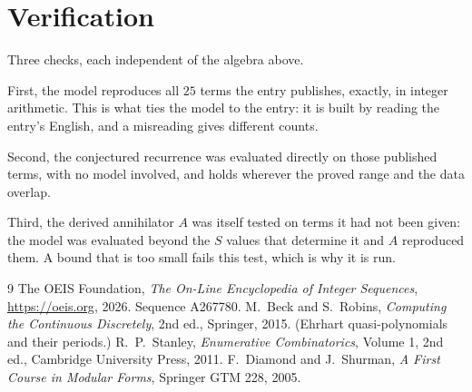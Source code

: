 \documentclass[11pt,a4paper]{article}
\theoremstyle{plain}
\theoremstyle{definition}
\begin{document}
\section{Verification}

Three checks, each independent of the algebra above.

First, the model reproduces all $25$ terms the entry publishes, exactly, in integer
arithmetic. This is what ties the model to the entry: it is built by reading the entry's
English, and a misreading gives different counts.

Second, the conjectured recurrence was evaluated directly on those published terms, with no
model involved, and holds wherever the proved range and the data overlap.

Third, the derived annihilator $A$ was itself tested on terms it had not been given: the model
was evaluated beyond the $S$ values that determine it and $A$ reproduced them. A bound that is
too small fails this test, which is why it is run.

\begin{thebibliography}{9}
 The OEIS Foundation, \emph{The On-Line Encyclopedia of Integer
Sequences}, \url{https://oeis.org}, 2026. Sequence A267780.
 M.~Beck and S.~Robins, \emph{Computing the Continuous Discretely},
2nd ed., Springer, 2015. (Ehrhart quasi-polynomials and their periods.)
 R.~P.~Stanley, \emph{Enumerative Combinatorics}, Volume 1, 2nd ed.,
Cambridge University Press, 2011.
 F.~Diamond and J.~Shurman, \emph{A First Course in Modular Forms},
Springer GTM 228, 2005.
\end{thebibliography}
\end{document}
